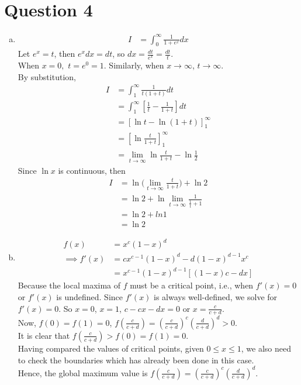 \documentclass[11pt]{article}
\begin{document}
\section*{Question 4}
\begin{enumerate}[(a)]
    \item 
    \begin{align*}
        I&= \int_0^\infty \frac{1}{1+e^x} dx 
    \end{align*}
    Let $e^x =t$, then $e^x dx = dt$, so $\displaystyle dx= \frac{dt}{e^x}=\frac{dt}{t}.$ \\
    When $x=0,$ $t=e^0=1$. Similarly, when $x \to \infty$, $t\to \infty.$\\
    By substitution, 
    \begin{align*}
        I&= \int_1^\infty \frac{1}{t(1+t)}dt \\
        &= \int_1^ \infty \left[\frac{1}{t}-\frac{1}{1+t}\right]dt\\
        &= \left[\ln{t} - \ln{(1+t)}\right]_1^\infty \\
        &= \left[\ln{\frac{t}{1+t}}\right]_1^\infty \\
        &= \lim_{t\to \infty} \ln{\frac{t}{1+t}}-\ln{\frac{1}{2}}
    \end{align*}
    Since $\ln{x}$ is continuous, then 
    \begin{align*}
        I&= \ln{(\lim_{t\to \infty}\frac{t}{1+t}})+\ln{2}\\
        &= \ln{2} + \ln{\lim_{t \to \infty}\frac{1}{\frac{1}{t}+1}}\\
        &= \ln{2} + ln{1} \\
        &= \ln{2}
    \end{align*}
    \item
    \begin{align*}
        f(x)&= x^c (1-x)^d\\
        \implies f'(x)&= cx^{c-1}(1-x)^d - d(1-x)^{d-1}x^c\\
        &= x^{c-1}(1-x)^{d-1}[(1-x)c-dx]
    \end{align*}
    Because the local maxima of $f$ must be a critical point,  i.e., when $f'(x)=0$ or $f'(x)$ is undefined. Since $f'(x)$ is always well-defined, we solve for $f'(x)=0$. So $x=0$, $x=1$, $c-cx-dx=0$ or $x=\frac{c}{c+d}.$\\
    Now, $f(0)=f(1)=0$, $f(\frac{c}{c+d})=(\frac{c}{c+d})^c(\frac{d}{c+d})^d>0.$\\
    It is clear that $f(\frac{c}{c+d})>f(0)=f(1)=0.$\\
    Having compared the values of critical points, given $0\leq x \leq1$, we also need to check the boundaries which has already been done in this case. \\
    Hence, the global maximum value is $f(\frac{c}{c+d})=(\frac{c}{c+d})^c(\frac{d}{c+d})^d.$
\end{enumerate}
\newpage 
\end{document}
